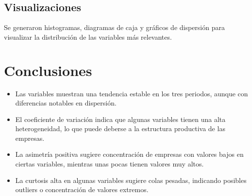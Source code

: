 \documentclass[a4paper, 12pt]{article}
\begin{document}
\subsection{Visualizaciones}
Se generaron histogramas, diagramas de caja y gráficos de dispersión para visualizar la distribución de las variables más relevantes.

\section{Conclusiones}

\begin{itemize}
    \item Las variables muestran una tendencia estable en los tres periodos, aunque con diferencias notables en dispersión.
    \item El coeficiente de variación indica que algunas variables tienen una alta heterogeneidad, lo que puede deberse a la estructura productiva de las empresas.
    \item La asimetría positiva sugiere concentración de empresas con valores bajos en ciertas variables, mientras unas pocas tienen valores muy altos.
    \item La curtosis alta en algunas variables sugiere colas pesadas, indicando posibles outliers o concentración de valores extremos.
\end{itemize}
\end{document}
